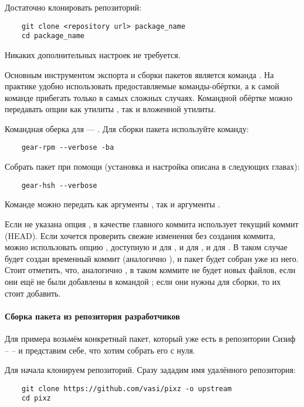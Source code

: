 
Достаточно клонировать репозиторий: 
\begin{verbatim}
	git clone <repository url> package_name
	cd package_name
\end{verbatim}

Никаких дополнительных настроек не требуется.


Основным инструментом экспорта и сборки пакетов является команда . На практике удобно 
использовать предоставляемые команды-обёртки, а к самой команде  прибегать только в 
самых сложных случаях. Командной обёртке можно передавать опции как утилиты , так и 
вложенной утилиты.

Командная оберка  для  --- . Для сборки пакета используйте команду: 
\begin{verbatim}
	gear-rpm --verbose -ba
\end{verbatim}


Собрать пакет при помощи  (установка и настройка  описана в следующих главах): 
\begin{verbatim}
	gear-hsh --verbose
\end{verbatim}

Команде  можно передать как аргументы , так и аргументы .

Если не указана опция ,  в качестве главного коммита использует текущий 
коммит (HEAD). Если хочется проверить свежие изменения без создания коммита, можно использовать опцию 
, доступную и для , и для , и для . В таком случае 
будет создан временный коммит (аналогично ), и пакет будет собран уже из него. 
Стоит отметить, что, аналогично , в таком коммите не будет новых файлов, если они 
ещё не были добавлены в  командой ; если они нужны для сборки, то их стоит добавить. 

\paragraph{Сборка пакета из репозитория разработчиков}
Для примера возьмём конкретный пакет, который уже есть в репозитории Сизиф --  -- и представим 
себе, что хотим собрать его с нуля.

Для начала клонируем репозиторий. Сразу зададим имя удалённого репозитория: 
\begin{verbatim}
	git clone https://github.com/vasi/pixz -o upstream
	cd pixz
\end{verbatim}

